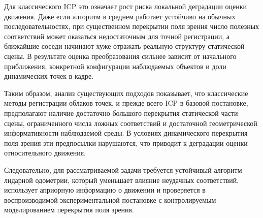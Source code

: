 Для классического ICP это означает рост риска локальной деградации оценки движения. Даже если алгоритм в среднем работает устойчиво на обычных последовательностях, при существенном перекрытии поля зрения число полезных соответствий может оказаться недостаточным для точной регистрации, а ближайшие соседи начинают хуже отражать реальную структуру статической сцены. В результате оценка преобразования сильнее зависит от начального приближения, конкретной конфигурации наблюдаемых объектов и доли динамических точек в кадре.

Таким образом, анализ существующих подходов показывает, что классические методы регистрации облаков точек, и прежде всего ICP в базовой постановке, предполагают наличие достаточно большого перекрытия статической части сцены, ограниченного числа ложных соответствий и достаточной геометрической информативности наблюдаемой среды. В условиях динамического перекрытия поля зрения эти предпосылки нарушаются, что приводит к деградации оценки относительного движения.

Следовательно, для рассматриваемой задачи требуется устойчивый алгоритм лидарной одометрии, который уменьшает влияние неудачных соответствий, использует априорную информацию о движении и проверяется в воспроизводимой экспериментальной постановке с контролируемым моделированием перекрытия поля зрения.
